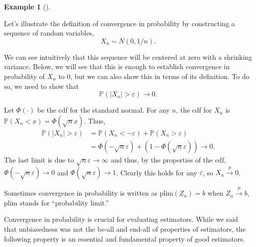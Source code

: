 \documentclass[
  letterpaper,
  DIV=11,
  numbers=noendperiod]{scrreprt}
\renewcommand{\P}{\mathbb{P}}
\newcommand{\inprob}{\overset{p}{\to}}
\theoremstyle{definition}
\newtheorem{example}{Example}[chapter]
\theoremstyle{definition}
\theoremstyle{plain}
\theoremstyle{remark}
\begin{document}
\begin{example}[]\protect\hypertarget{exm-inprob}{}\label{exm-inprob}

Let's illustrate the definition of convergence in probability by
constructing a sequence of random variables, \[
X_n \sim N(0, 1/n).
\]

We can see intuitively that this sequence will be centered at zero with
a shrinking variance. Below, we will see that this is enough to
establish convergence in probability of \(X_n\) to 0, but we can also
show this in terms of its definition. To do so, we need to show that \[
\P(|X_n| > \varepsilon) \to 0.
\]

Let \(\Phi(\cdot)\) be the cdf for the standard normal. For any \(n\),
the cdf for \(X_n\) is \(\P(X_{n} < x) = \Phi(\sqrt{n}x)\). Thus, \[
\begin{aligned}
\P(|X_n| > \varepsilon) &= \P(X_n < -\varepsilon) + \P(X_n > \varepsilon) \\ &= \Phi(-\sqrt{n}\varepsilon) + (1 - \Phi(\sqrt{n}\varepsilon)) \to 0.
\end{aligned}
\] The last limit is due to \(\sqrt{n}\varepsilon \to \infty\) and thus,
by the properties of the cdf, \(\Phi(-\sqrt{n}\varepsilon) \to 0\) and
\(\Phi(\sqrt{n}\varepsilon) \to 1\). Clearly this holds for any
\(\varepsilon\), so \(X_n \inprob 0\).

\end{example}

\begin{tcolorbox}[enhanced jigsaw, breakable, colback=white, left=2mm, colbacktitle=quarto-callout-note-color!10!white, rightrule=.15mm, toprule=.15mm, bottomtitle=1mm, toptitle=1mm, leftrule=.75mm, coltitle=black, arc=.35mm, title=\textcolor{quarto-callout-note-color}{\faInfo}\hspace{0.5em}{Notation alert}, titlerule=0mm, colframe=quarto-callout-note-color-frame, bottomrule=.15mm, opacitybacktitle=0.6, opacityback=0]

Sometimes convergence in probability is written as
\(\text{plim}(Z_n) = b\) when \(Z_n \inprob b\), \(\text{plim}\) stands
for ``probability limit.''

\end{tcolorbox}

Convergence in probability is crucial for evaluating estimators. While
we said that unbiasedness was not the be-all and end-all of properties
of estimators, the following property is an essential and fundamental
property of good estimators.
\end{document}
